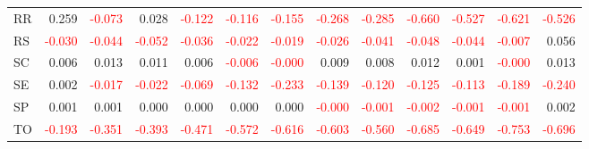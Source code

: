 \begin{table}[!htb]
{\begin{tabular}{lrrrrrrrrrrrr}
      RR & 0.259 & \textcolor{red}{-0.073} & 0.028 & \textcolor{red}{-0.122} & \textcolor{red}{-0.116} & \textcolor{red}{-0.155} & \textcolor{red}{-0.268} & \textcolor{red}{-0.285} & \textcolor{red}{-0.660} & \textcolor{red}{-0.527} & \textcolor{red}{-0.621} & \textcolor{red}{-0.526} \\
      RS & \textcolor{red}{-0.030} & \textcolor{red}{-0.044} & \textcolor{red}{-0.052} & \textcolor{red}{-0.036} & \textcolor{red}{-0.022} & \textcolor{red}{-0.019} & \textcolor{red}{-0.026} & \textcolor{red}{-0.041} & \textcolor{red}{-0.048} & \textcolor{red}{-0.044} & \textcolor{red}{-0.007} & 0.056 \\
      SC & 0.006 & 0.013 & 0.011 & 0.006 & \textcolor{red}{-0.006} & \textcolor{red}{-0.000} & 0.009 & 0.008 & 0.012 & 0.001 & \textcolor{red}{-0.000} & 0.013 \\
      SE & 0.002 & \textcolor{red}{-0.017} & \textcolor{red}{-0.022} & \textcolor{red}{-0.069} & \textcolor{red}{-0.132} & \textcolor{red}{-0.233} & \textcolor{red}{-0.139} & \textcolor{red}{-0.120} & \textcolor{red}{-0.125} & \textcolor{red}{-0.113} & \textcolor{red}{-0.189} & \textcolor{red}{-0.240} \\
      SP & 0.001 & 0.001 & 0.000 & 0.000 & 0.000 & 0.000 & \textcolor{red}{-0.000} & \textcolor{red}{-0.001} & \textcolor{red}{-0.002} & \textcolor{red}{-0.001} & \textcolor{red}{-0.001} & 0.002 \\
      TO & \textcolor{red}{-0.193} & \textcolor{red}{-0.351} & \textcolor{red}{-0.393} & \textcolor{red}{-0.471} & \textcolor{red}{-0.572} & \textcolor{red}{-0.616} & \textcolor{red}{-0.603} & \textcolor{red}{-0.560} & \textcolor{red}{-0.685} & \textcolor{red}{-0.649} & \textcolor{red}{-0.753} & \textcolor{red}{-0.696} \\
      \hline
    \end{tabular}%
  }
  \label{tab:adm_var_sh}
\end{table}
